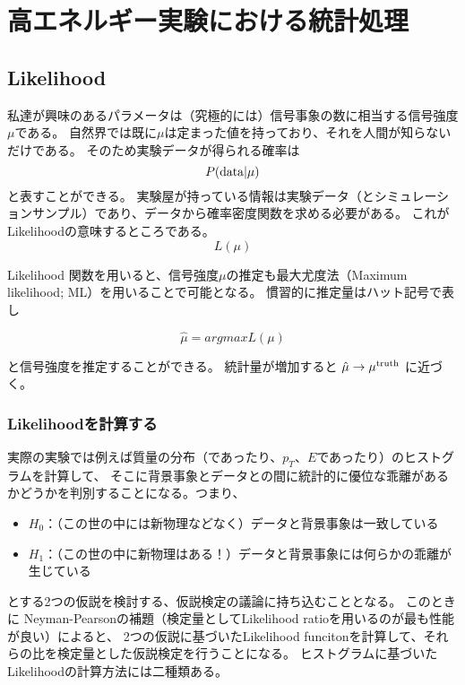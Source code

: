
\chapter{高エネルギー実験における統計処理}
\section{Likelihood}
私達が興味のあるパラメータは（究極的には）信号事象の数に相当する信号強度$\mu$である。
自然界では既に$\mu$は定まった値を持っており、それを人間が知らないだけである。
そのため実験データが得られる確率は
\begin{equation}
P(\rm{data}|\mu)
\end{equation}
と表すことができる。
実験屋が持っている情報は実験データ（とシミュレーションサンプル）であり、データから確率密度関数を求める必要がある。
これがLikelihoodの意味するところである。
\begin{equation}
L(\mu)
\end{equation}

Likelihood 関数を用いると、信号強度$\mu$の推定も最大尤度法（Maximum likelihood; ML）を用いることで可能となる。
慣習的に推定量はハット記号で表し

\begin{equation}
\hat{\mu} = arg max L(\mu)
\end{equation}

と信号強度を推定することができる。
統計量が増加すると $\hat{\mu}\to\mu^{\rm{truth}}$ に近づく。

\subsection{Likelihoodを計算する}
実際の実験では例えば質量の分布（であったり、$p_T$、$E$であったり）のヒストグラムを計算して、
そこに背景事象とデータとの間に統計的に優位な乖離があるかどうかを判別することになる。つまり、

\begin{itemize}
  \item $H_0$：（この世の中には新物理などなく）データと背景事象は一致している
  \item $H_1$：（この世の中に新物理はある！）データと背景事象には何らかの乖離が生じている
\end{itemize}

とする2つの仮説を検討する、仮説検定の議論に持ち込むこととなる。
このときに Neyman-Pearsonの補題（検定量としてLikelihood ratioを用いるのが最も性能が良い）によると、
2つの仮説に基づいたLikelihood funcitonを計算して、それらの比を検定量とした仮説検定を行うことになる。
ヒストグラムに基づいたLikelihoodの計算方法には二種類ある。


